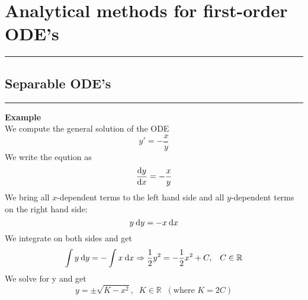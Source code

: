 \section{Analytical methods for first-order ODE’s}
\noindent\rule[\linienAbstand]{\linewidth}{\linienDickeDick}


\subsection{Separable ODE’s}
\noindent\rule[\linienAbstand]{\linewidth}{\linienDicke}
\textbf{Example}\\
We compute the general solution of the ODE
\begin{equation}
  y' = -\frac{x}{y}
\end{equation}
We write the eqution as
\begin{equation}
  \frac{\textup{d}y}{\textup{d}x} = -\frac{x}{y}
\end{equation}
We bring all $x$-dependent terms to the left hand side and all $y$-dependent terms on
the right hand side:
\begin{equation}
  y\:\textup{d}y = -x \:\textup{d}x
\end{equation}
We integrate on both sides and get
\begin{equation}
  \int y\:\textup{d}y = - \int x\:\textup{d}x \Rightarrow \frac{1}{2}y^2 = - \frac{1}{2} x^2 + C, \;\;\; C \in \mathbb{R}
\end{equation}
We solve for y and get
\begin{equation}
  y = \pm \sqrt{K - x^2}, \;\; K \in \mathbb{R}\;\; (\text{where } K = 2C)
\end{equation}

%
%
